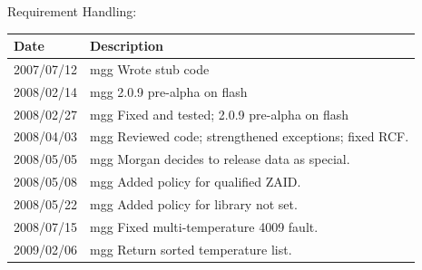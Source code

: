 Requirement Handling:

\begin{tabular}{|p{72pt}|p{351pt}|} \hline
Date & Description \\ \hline
2007/07/12 & mgg Wrote stub code \\ \hline
2008/02/14 & mgg 2.0.9 pre-alpha on flash \\ \hline
2008/02/27 & mgg Fixed and tested; 2.0.9 pre-alpha on flash \\ \hline
2008/04/03 & mgg Reviewed code; strengthened exceptions; fixed RCF. \\ \hline
2008/05/05 & mgg Morgan decides to release data as special. \\ \hline
2008/05/08 & mgg Added policy for qualified ZAID.\\ \hline
2008/05/22 & mgg Added policy for library not set. \\ \hline
2008/07/15 & mgg Fixed multi-temperature 4009 fault. \\ \hline
2009/02/06 & mgg Return sorted temperature list. \\ \hline
\end{tabular}

